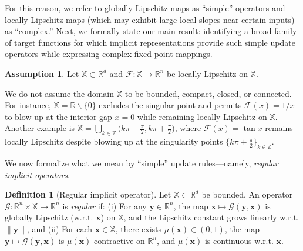\documentclass{amsart} %
\def\eqref#1{equation~\ref{#1}}
\def\vx{{\bm{x}}}
\def\vy{{\bm{y}}}
\def\sR{{\mathbb{R}}}
\def\sX{{\mathbb{X}}}
\def\sZ{{\mathbb{Z}}}
\def\cF{{\mathcal{F}}}
\def\cG{{\mathcal{G}}}
\theoremstyle{definition}
\newtheorem{definition}[theorem]{Definition}
\newtheorem{assumption}[theorem]{Assumption}
\theoremstyle{remark}
\renewcommand{\eqref}[1]{\textup{(\ref{#1})}}
\begin{document}
For this reason, we refer to globally Lipschitz maps as “simple” operators and locally Lipschitz maps (which may exhibit large local slopes near certain inputs) as “complex.” Next, we formally state our main result: identifying a broad family of target functions for which implicit representations provide such simple update operators while expressing complex fixed-point mappings.

\begin{assumption}
    \label{asmp:f} 
    Let $\sX \subset \sR^d$ and $\cF:\sX\to\sR^n$ be locally Lipschitz on $\sX$.
\end{assumption}

We do not assume the domain $\sX$ to be bounded, compact, closed, or connected. 
For instance, $\sX=\sR \backslash \{0\}$ excludes the singular point and permits $\cF(x)=1/x$ to blow up at the interior gap $x=0$ while remaining locally Lipschitz on $\sX$. 
Another example is $\sX = \bigcup_{k \in \sZ} \bigl(k\pi -\tfrac{\pi}{2}, k\pi + \tfrac{\pi}{2}\bigr)$, where $\cF(x)=\tan x$ remains locally Lipschitz despite blowing up at the singularity points $\{k\pi + \tfrac{\pi}{2}\}_{k \in \sZ}$.


We now formalize what we mean by “simple” update rules—namely, \emph{regular implicit operators}.

\begin{definition}[Regular implicit operator]
\label{def:regular-g}
Let $\sX\subset\sR^d$ be bounded. An operator $\cG:\sR^n\times\sX\to\sR^n$ is \emph{regular} if: (i) For any $\vy \in \sR^n$, the map $\vx\mapsto \cG(\vy,\vx)$ is {globally} Lipschitz (w.r.t. $\vx$) on $\sX$, and the Lipschitz constant grows linearly w.r.t. $\|\vy\|$, and (ii) For each $\vx \in \sX$, there exists $\mu(\vx)\in (0,1)$, the map $\vy \mapsto \cG(\vy,\vx)$ is $\mu(\vx)$-{contractive} on $\sR^n$, and $\mu(\vx)$ is continuous w.r.t. $\vx$.
\end{definition}


\end{document}
